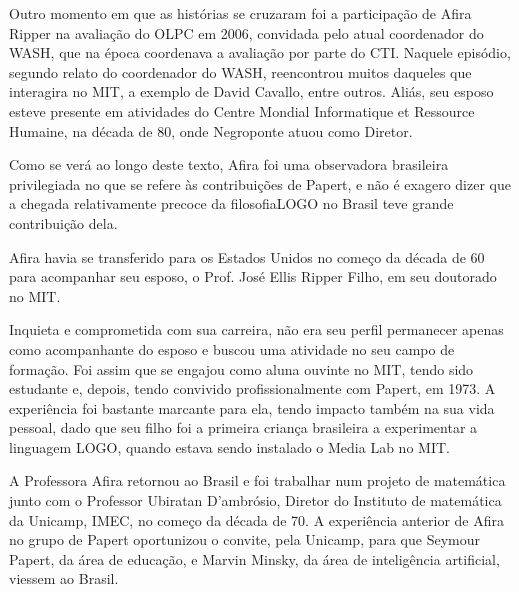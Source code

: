 \documentclass[
12pt,		%
openright,	%
twoside,  %
a4paper,			%
chapter=TITLE,		%
english,			%
french,				%
spanish,			%
brazil				%
]{USPSC-classe/USPSC}
\begin{document}
Outro momento em que as hist\'orias se cruzaram foi a participa\c{c}\~ao de Afira Ripper na avalia\c{c}\~ao do OLPC em 2006, convidada pelo atual coordenador do WASH, que na \'epoca coordenava a avalia\c{c}\~ao por parte do CTI. Naquele epis\'odio, segundo relato do coordenador do WASH, reencontrou muitos daqueles que interagira no MIT, a exemplo de David Cavallo, entre outros. Ali\'as, seu esposo esteve presente em atividades do Centre Mondial Informatique et Ressource Humaine, na d\'ecada de 80, onde Negroponte atuou como Diretor.








Como se ver\'a ao longo deste texto, Afira foi uma observadora brasileira privilegiada no que se refere \`as contribui\c{c}\~oes de Papert, e n\~ao \'e exagero dizer que a chegada relativamente precoce da \textquotedbl filosofia\textquotedbl  LOGO no Brasil teve grande contribui\c{c}\~ao dela.








Afira havia se transferido para os Estados Unidos no come\c{c}o da d\'ecada de 60 para acompanhar seu esposo, o Prof. Jos\'e Ellis Ripper Filho, em seu doutorado no MIT.








Inquieta e comprometida com sua carreira, n\~ao era seu perfil permanecer apenas como acompanhante do esposo e buscou uma atividade no seu campo de forma\c{c}\~ao. Foi assim que se engajou como aluna ouvinte no MIT, tendo sido estudante e, depois, tendo convivido profissionalmente com Papert, em 1973. A experi\^encia foi bastante marcante para ela, tendo impacto tamb\'em na sua vida pessoal, dado que seu filho foi a primeira crian\c{c}a brasileira a experimentar a linguagem LOGO, quando estava sendo instalado o Media Lab no MIT.








A Professora Afira retornou ao Brasil e foi trabalhar num projeto de matem\'atica junto com o Professor Ubiratan D’ambr\'osio, Diretor do Instituto de matem\'atica da Unicamp, IMEC, no come\c{c}o da d\'ecada de 70. A experi\^encia anterior de Afira no grupo de Papert oportunizou o convite, pela Unicamp, para que Seymour Papert, da \'area de educa\c{c}\~ao, e Marvin Minsky, da \'area de intelig\^encia artificial, viessem ao Brasil.
\end{document}
